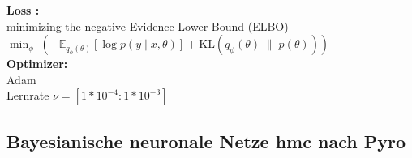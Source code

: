 \begin{center}
\begin{minipage}[t]{0.48\textwidth}
\textbf{\glqq Loss \grqq:} \\
\glqq minimizing the negative Evidence Lower Bound (ELBO)\grqq ~\parencite[S.6 Z.5-8]{PyroPplDevelopers.2024}
$
\min_{\phi} \; \left( 
    - \mathbb{E}_{q_{\phi}(\theta)} 
    \left[ 
        \log p(y \mid x, \theta)
    \right]
    + \mathrm{KL}\left( 
        q_{\phi}(\theta) \;\|\; p(\theta)
    \right)
\right)
$
\\[4pt]

\textbf{Optimizer:} \\
Adam ~\parencite[S. 6, Z. 9–10]{PyroPplDevelopers.2024} \\
Lernrate $\nu = [1 * 10^{-4}:1 * 10^{-3}]$ \\
\end{minipage}
\end{center}




\newpage


\subsection*{\gls{Bayesianische neuronale Netze} \gls{hmc} nach Pyro \parencite{PyroPplDevelopers.2024}}

\par\vspace{1\baselineskip}\noindent

